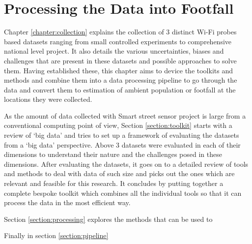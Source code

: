 \chapter{Processing the Data into Footfall} \label{chapter:processing}

Chapter \ref{chapter:collection} explains the collection of 3 distinct Wi-Fi probes based datasets ranging from small controlled experiments to comprehensive national level project.
It also details the various uncertainties, biases and challenges that are present in these datasets and possible approaches to solve them.
Having established these, this chapter aims to device the toolkits and methods and combine them into a data processing pipeline to go through the data and convert them to estimation of ambient population or footfall at the locations they were collected.

As the amount of data collected with Smart street sensor project is large from a conventional computing point of view, Section \ref{section:toolkit} starts with a review of `big data' and tries to set up a framework of evaluating the datasets from a `big data' perspective.
Above 3 datasets were evaluated in each of their dimensions to understand their nature and the challenges posed in these dimensions.
After evaluating the datasets, it goes on to a detailed review of tools and methods to deal with data of such size and picks out the ones which are relevant and feasible for this research.
It concludes by putting together a complete bespoke toolkit which combines all the individual tools so that it can process the data in the most efficient way.

Section \ref{section:processing} explores the methods that can be used to 

Finally in section \ref{section:pipeline}

\cleardoublepage


\cleardoublepage


\cleardoublepage

